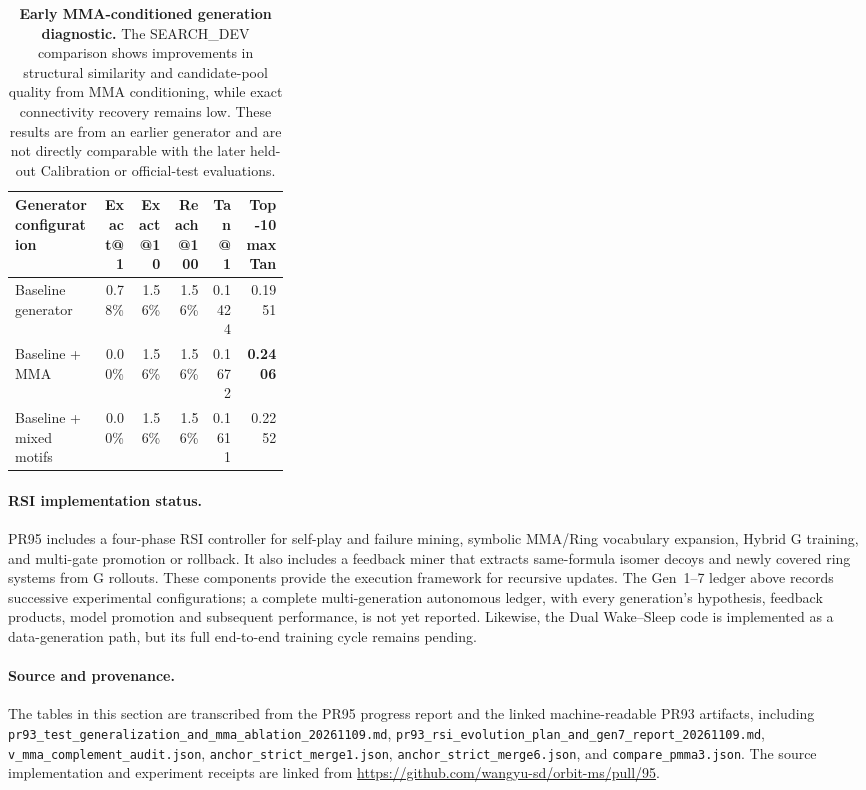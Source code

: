 \begin{table}[!htbp]
\centering
\caption{\textbf{Early MMA-conditioned generation diagnostic.}
The SEARCH\_DEV comparison shows improvements in structural similarity and
candidate-pool quality from MMA conditioning, while exact connectivity recovery
remains low. These results are from an earlier generator and are not directly
comparable with the later held-out Calibration or official-test evaluations.}
\label{tab:early_mma_search_dev}
\small
\setlength{\tabcolsep}{3pt}
\begin{tabular}{@{}p{0.32\linewidth}rrrrr@{}}
\toprule
Generator configuration & Exact@1 & Exact@10 & Reach@100 & Tan@1 & Top-10 max Tan \\
\midrule
Baseline generator & 0.78\% & 1.56\% & 1.56\% & 0.1424 & 0.1951 \\
Baseline + MMA & 0.00\% & 1.56\% & 1.56\% & 0.1672 & \textbf{0.2406} \\
Baseline + mixed motifs & 0.00\% & 1.56\% & 1.56\% & 0.1611 & 0.2252 \\
\bottomrule
\end{tabular}
\end{table}

\paragraph{RSI implementation status.}
PR95 includes a four-phase RSI controller for self-play and failure mining,
symbolic MMA/Ring vocabulary expansion, Hybrid G training, and multi-gate
promotion or rollback. It also includes a feedback miner that extracts
same-formula isomer decoys and newly covered ring systems from G rollouts.
These components provide the execution framework for recursive updates.
The Gen~1--7 ledger above records successive experimental configurations;
a complete multi-generation autonomous ledger, with every generation's
hypothesis, feedback products, model promotion and subsequent performance,
is not yet reported. Likewise, the Dual Wake--Sleep code is implemented as a
data-generation path, but its full end-to-end training cycle remains pending.

\paragraph{Source and provenance.}
The tables in this section are transcribed from the PR95 progress report and
the linked machine-readable PR93 artifacts, including
\texttt{pr93\_test\_generalization\_and\_mma\_ablation\_20261109.md},
\texttt{pr93\_rsi\_evolution\_plan\_and\_gen7\_report\_20261109.md},
\texttt{v\_mma\_complement\_audit.json},
\texttt{anchor\_strict\_merge1.json},
\texttt{anchor\_strict\_merge6.json}, and
\texttt{compare\_pmma3.json}. The source implementation and experiment receipts
are linked from \url{https://github.com/wangyu-sd/orbit-ms/pull/95}.

\clearpage
